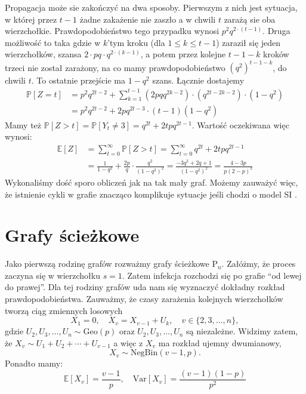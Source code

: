 Propagacja może sie zakończyć na dwa sposoby. Pierwszym z nich jest sytuacja, w której przez $t-1$ żadne zakażenie nie zaszło a w chwili $t$ zarażą sie oba wierzchołkie. Prawdopodobieństwo tego przypadku wynosi $p^2q^{2\cdot(t-1)}$. Druga możliwość to taka gdzie w $k$'tym kroku (dla $1\le k\le t-1$) zaraził się jeden wierzchołków, szansa $2\cdot pq\cdot q^{2\cdot(k-1)}$,  a potem przez kolejne $t-1-k$ kroków trzeci nie został zarażony, na co mamy prawdopodobieństwo ${(q^2)}^{t-1-k}$, do chwili $t$. To ostatnie przejście ma $1-q^2$ szans. Łącznie dostajemy
\begin{equation*}
\begin{aligned}
\mathbb{P}[Z=t]
&=p^2q^{2t-2}+\sum_{k=1}^{t-1} (2pqq^{2k-2})\cdot (q^{2t-2k-2}) \cdot (1-q^2) \\
&=p^2q^{2t-2}+2pq^{2t-3}\cdot(t-1)(1-q^2) 
\end{aligned}
\end{equation*}
Mamy też $\mathbb{P}[Z>t]=\mathbb{P}[Y_t\ne 3] = q^{2t}+2tpq^{2t-1}$. Wartość oczekiwana więc wynosi:
\begin{equation*}
\begin{aligned}
\mathbb{E}[Z]
&=\sum_{t=0}^{\infty} \mathbb{P}[Z>t]=\sum_{t=0}^{\infty} q^{2t}+2tpq^{2t-1} \\
&=\frac{1}{1-q^2}+\frac{2p}{q}\cdot \frac{q^2}{{(1-q^2)}^2}=\frac{-3q^2+2q+1}{{(1-q^2)}^2}=\frac{4-3p}{p{(2-p)}^2}
\end{aligned}
\end{equation*}
Wykonaliśmy dość sporo obliczeń jak na tak mały graf. Możemy zauważyć więc, że istnienie cykli w grafie znacząco komplikuje sytuacje jeśli chodzi o model SI \@. 


\section{Grafy ścieżkowe}

Jako pierwszą rodzinę grafów rozważmy grafy ścieżkowe $\mathrm{P}_n$. Załóżmy, że proces zaczyna się w wierzchołku $s=1$. Zatem infekcja rozchodzi się po grafie ``od lewej do prawej''. Dla tej rodziny grafów uda nam się wyznaczyć dokładny rozkład prawdopodobieństwa. Zauważmy, że czasy zarażenia kolejnych wierzchołków tworzą ciąg zmiennych losowych
\[
X_1 = 0, \quad X_{v} = X_{v-1} + U_k, \quad v\in\{2,3,\dots,n\},
\]
gdzie $U_2,U_3,\dots,U_n \sim \mathrm{Geo}(p)$ oraz $U_2,U_3,\dots,U_n$ są niezależne. 
Widzimy zatem, że $X_v \sim U_1 + U_2 + \cdots + U_{v-1}$ a więc z  $X_v$ ma rozkład ujemny dwumianowy, 
\[
X_v\sim \mathrm{NegBin}(v-1, p).
\]
Ponadto mamy:
\[
    \mathbb{E}[X_v] = \frac{v-1}{p}, \quad \mathrm{Var}[X_v] = \frac{(v-1)(1-p)}{p^2}
\]

